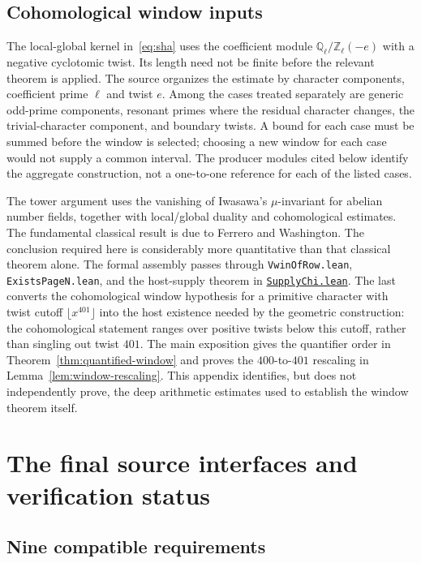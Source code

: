\documentclass[11pt,openany,oneside]{scrbook}
\theoremstyle{definition}
\theoremstyle{remark}
\newcommand{\QQ}{\mathbb Q}
\newcommand{\ZZ}{\mathbb Z}
\newcommand{\baseurl}{https://github.com/CocoSgt/riemann-hypothesis-lean/blob/7cbf7a0c32fca1badf05931879a37c3f8a2b03b4/}
\newcommand{\sourcefile}[2]{\href{\baseurl#1}{\texttt{#2}}}
\begin{document}
\section{Cohomological window inputs}\label{app:window-technical}

The local-global kernel in~\eqref{eq:sha} uses the coefficient module $\QQ_\ell/\ZZ_\ell(-e)$ with a negative cyclotomic twist.  Its length need not be finite before the relevant theorem is applied.  The source organizes the estimate by character components, coefficient prime $\ell$ and twist $e$.  Among the cases treated separately are generic odd-prime components, resonant primes where the residual character changes, the trivial-character component, and boundary twists.  A bound for each case must be summed before the window is selected; choosing a new window for each case would not supply a common interval. The producer modules cited below identify the aggregate construction, not a one-to-one reference for each of the listed cases.

The tower argument uses the vanishing of Iwasawa's $\mu$-invariant for abelian number fields, together with local/global duality and cohomological estimates.  The fundamental classical result is due to Ferrero and Washington.  The conclusion required here is considerably more quantitative than that classical theorem alone.  The formal assembly passes through \texttt{VwinOfRow.lean}, \texttt{ExistsPageN.lean}, and the host-supply theorem in
\sourcefile{src/Development/AutomorphicArithmetic/CharacterBoxes/SupplyChi.lean}{SupplyChi.lean}.  The last converts the cohomological window hypothesis for a primitive character with twist cutoff $\lfloor x^{401}\rfloor$ into the host existence needed by the geometric construction: the cohomological statement ranges over positive twists below this cutoff, rather than singling out twist $401$.  The main exposition gives the quantifier order in Theorem~\ref{thm:quantified-window} and proves the $400$-to-$401$ rescaling in Lemma~\ref{lem:window-rescaling}.  This appendix identifies, but does not independently prove, the deep arithmetic estimates used to establish the window theorem itself.

\chapter{The final source interfaces and verification status}\label{app:final}

\section{Nine compatible requirements}\label{app:assembly-technical}
\end{document}
